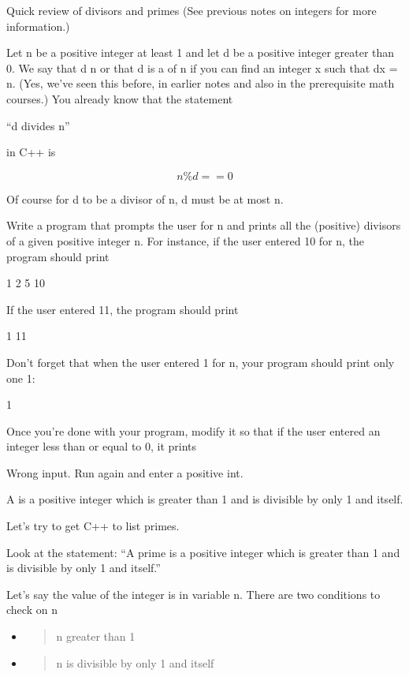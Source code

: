 \begin{console}
\begin{console}
\newpage{}

Quick review of divisors and primes (See previous notes on integers for
more information.)

Let n be a positive integer at least 1 and let d be a positive integer
greater than 0. We say that d  n or that d is a
 of n if you can find an integer x such that dx = n.
(Yes, we've seen this before, in earlier notes and also
in the prerequisite math courses.) You already know that the statement
\begin{center}
``d divides n''
\end{center}
in C++ is

\[n \% d == 0\]

Of course for d to be a divisor of n, d must be at most n.

\begin{ex}
Write a program that prompts the user for n and
prints all the (positive) divisors of a given positive integer n. For
instance, if the user entered 10 for n, the program should print
\begin{console}
1
2
5
10
\end{console}
If the user entered 11, the program should print
\begin{console}
1
11
\end{console}
Don't forget that when the user entered 1 for n, your
program should print only one 1:
\begin{console}
1
\end{console}
Once you're done with your program, modify it so that if
the user entered an integer less than or equal to 0, it prints
\begin{console}
Wrong input. Run again and enter a positive int.
\end{console}
\end{ex}
A  is a positive integer which is greater than 1 and is
divisible by only 1 and itself.

Let's try to get C++ to list primes.

Look at the statement: ``A prime is a positive integer which is greater
than 1 and is divisible by only 1 and itself.''

Let's say the value of the integer is in variable n.
There are two conditions to check on n

\begin{itemize}
\item
  \begin{quote}
  n greater than 1
  \end{quote}
\item
  \begin{quote}
  n is divisible by only 1 and itself
  \end{quote}
\end{itemize}


\end{console}
\end{console}
